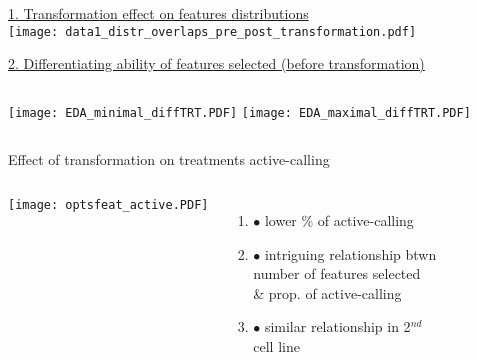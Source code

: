 \documentclass[11pt]{beamer}
\begin{document}
\begin{frame}
\underline{1. Transformation effect on features distributions} \\
\centering
\texttt{[image: data1\_distr\_overlaps\_pre\_post\_transformation.pdf]}
\end{frame}

\begin{frame}
\underline{2. Differentiating ability of features selected (before transformation)} \\
\begin{columns}
  \centering
\texttt{[image: EDA\_minimal\_diffTRT.PDF]}
  \centering
  \texttt{[image: EDA\_maximal\_diffTRT.PDF]}
\end{columns}
\end{frame}


\begin{frame}{Effect of transformation on treatments active-calling}
\begin{columns}
\flushleft
\texttt{[image: optsfeat\_active.PDF]}
\begin{enumerate}[ ]
\item \hspace{-1.5cm} $\bullet$ lower \% of active-calling
\item \hspace{-1.5cm} $\bullet$ intriguing relationship btwn  \\ \hspace{-1.5cm} number of features selected \\ \hspace{-1.5cm} \& prop. of active-calling
\item \hspace{-1.5cm} $\bullet$ similar relationship in 2$^{nd}$ \\ \hspace{-1.5cm} cell line
\end{enumerate}
\end{columns}
\end{frame}
\end{document}
